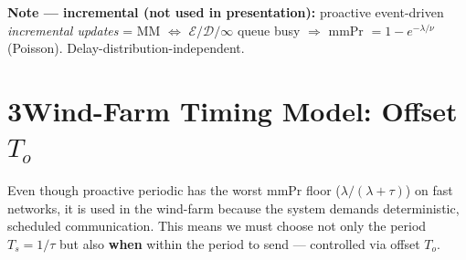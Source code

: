 \documentclass[10pt,a4paper]{article}
\begin{document}
\vspace{2pt}

\begin{notebox}
\footnotesize\textbf{Note --- incremental (not used in presentation):} proactive event-driven \emph{incremental updates} = MM $\Leftrightarrow$ $\mathcal{E}/\mathcal{D}/\infty$ queue busy $\Rightarrow$ mmPr $= 1-e^{-\lambda/\nu}$ (Poisson). Delay-distribution-independent.
\end{notebox}

\vspace{2pt}

\section*{3\quad Wind-Farm Timing Model: Offset $T_o$}
Even though proactive periodic has the worst mmPr floor ($\lambda/(\lambda{+}\tau)$) on fast networks, it is used in the wind-farm because the system demands deterministic, scheduled communication. This means we must choose not only the period $T_s = 1/\tau$ but also \textbf{when} within the period to send --- controlled via offset $T_o$.
\end{document}
